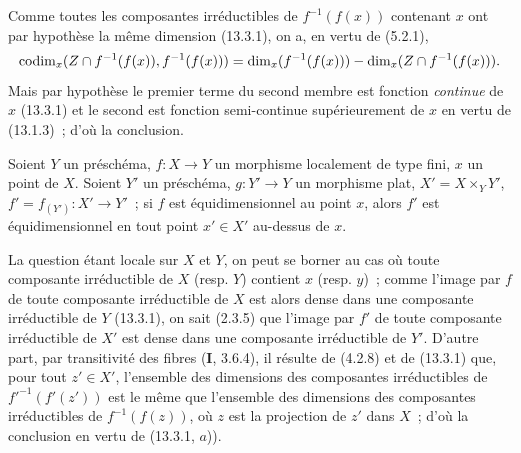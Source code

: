 Comme toutes les composantes irréductibles de $f^{-1}(f(x))$ contenant $x$
ont par hypothèse la même dimension (13.3.1), on a, en vertu de (5.2.1),
\[
  \operatorname{codim}_x(Z\cap f^{-1}(f(x)),f^{-1}(f(x)))
  =\dim_x(f^{-1}(f(x)))-\dim_x(Z\cap f^{-1}(f(x))).
\]
Mais par hypothèse le premier terme du second membre est fonction
\emph{continue} de $x$ (13.3.1) et le second est fonction semi-continue
supérieurement de $x$ en vertu de (13.1.3)~; d'où la conclusion.

\begin{proposition}[13.3.8]
\label{IV.13.3.8-fr}
Soient $Y$ un préschéma, $f:X\to Y$ un morphisme localement de type fini, $x$
un point de $X$. Soient $Y'$ un préschéma, $g:Y'\to Y$ un morphisme \textup{plat},
$X'=X\times_Y Y'$, $f'=f_{(Y')}:X'\to Y'$~; si $f$ est équidimensionnel au
point $x$, alors $f'$ est équidimensionnel en tout point $x'\in X'$ au-dessus
de $x$.
\end{proposition}

La question étant locale sur $X$ et $Y$, on peut se borner au cas où toute
composante irréductible de $X$ (resp. $Y$) contient $x$ (resp. $y$)~; comme
l'image par $f$ de toute composante irréductible de $X$ est alors dense dans
une composante irréductible de $Y$ (13.3.1), on sait (2.3.5) que l'image par
$f'$ de toute composante irréductible de $X'$ est dense dans une composante
irréductible de $Y'$. D'autre part, par transitivité des fibres
(\textbf{I}, 3.6.4), il résulte de (4.2.8) et de (13.3.1) que, pour tout
$z'\in X'$, l'ensemble des dimensions des composantes irréductibles de
${f'}^{-1}(f'(z'))$ est le même que l'ensemble des dimensions des composantes
irréductibles de $f^{-1}(f(z))$, où $z$ est la projection de $z'$ dans $X$~;
d'où la conclusion en vertu de (13.3.1, $a$)).

